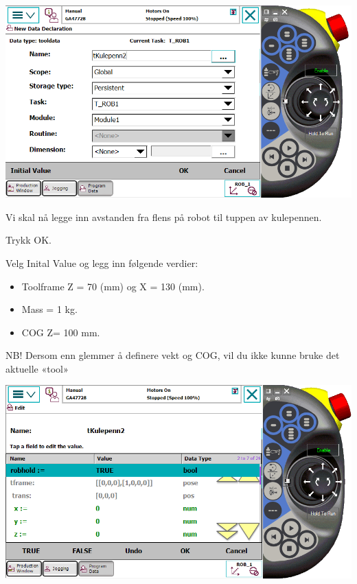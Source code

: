 \vspace{1cm}

\includegraphics[width=1\textwidth]{i04861x08}

\vspace{1cm}

Vi skal nå legge inn avstanden fra flens på robot til tuppen av kulepennen. 

Trykk OK.

\vspace{1cm}

Velg Inital Value og legg inn følgende verdier:
\begin{itemize}
\item Toolframe Z = 70 (mm) og X = 130 (mm). 
\item Mass = 1 kg. 
\item COG Z= 100 mm.
\end{itemize}
NB! Dersom enn glemmer å definere vekt og COG, vil du ikke kunne bruke
det aktuelle «tool»

\vspace{1cm}

\includegraphics[width=1\textwidth]{i04861x09}

